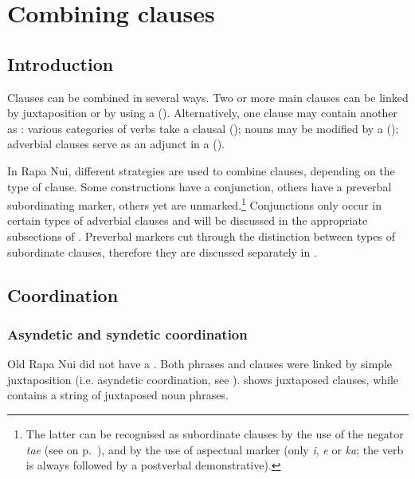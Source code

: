 \chapter[Combining clauses]{Combining clauses}\label{ch:11}
\section{Introduction}\label{sec:11.1}

Clauses can be combined in several ways. Two or more main clauses can be linked by juxtaposition or by using a  (). Alternatively, one clause may contain another as : various categories of verbs take a clausal  (); nouns may be modified by a  (); adverbial clauses serve as an adjunct in a  ().

In Rapa Nui, different strategies are used to combine clauses, depending on the type of clause. Some constructions have a conjunction, others have a preverbal subordinating marker, others yet are unmarked.\footnote{\label{fn:503}The latter can be recognised as subordinate clauses by the use of the negator \textit{ta{\ꞌ}e} (see  on p.~\pageref{ex:11.210}), and by the use of aspectual marker (only \textit{i}, \textit{e} or \textit{ka}; the verb is always followed by a postverbal demonstrative).} Conjunctions only occur in certain types of adverbial clauses and will be discussed in the appropriate subsections of . Preverbal markers cut through the distinction between types of subordinate clauses, therefore they are discussed separately in .

\section{Coordination} \label{sec:11.2}
\subsection{Asyndetic and syndetic coordination}\label{sec:11.2.1}

Old Rapa Nui did not have a . Both phrases and clauses were linked by simple juxtaposition (i.e. asyndetic coordination, see \citealt[7]{Haspelmath2007}).  shows juxtaposed clauses, while  contains a string of juxtaposed noun phrases.

